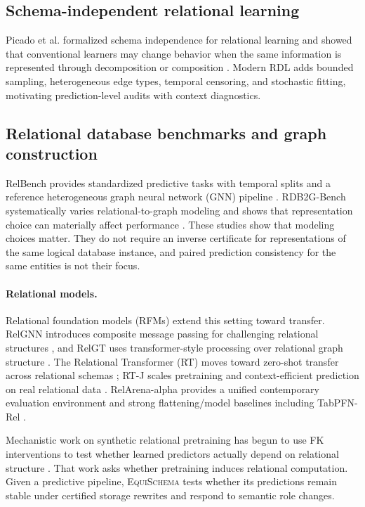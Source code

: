 \documentclass[runningheads]{llncs}
\newcommand{\method}{\textsc{EquiSchema}\xspace}
\begin{document}
\subsection{Schema-independent relational learning}
Picado et al. formalized schema independence for relational learning and showed that conventional learners may change behavior when the same information is represented through decomposition or composition \cite{picado2017schema}. Modern RDL adds bounded sampling, heterogeneous edge types, temporal censoring, and stochastic fitting, motivating prediction-level audits with context diagnostics.

\subsection{Relational database benchmarks and graph construction}
RelBench provides standardized predictive tasks with temporal splits and a reference heterogeneous graph neural network (GNN) pipeline \cite{robinson2024relbench}. RDB2G-Bench systematically varies relational-to-graph modeling and shows that representation choice can materially affect performance \cite{choi2025rdb2g}. These studies show that modeling choices matter. They do not require an inverse certificate for representations of the same logical database instance, and paired prediction consistency for the same entities is not their focus.

\paragraph{Relational models.}
Relational foundation models (RFMs) extend this setting toward transfer. RelGNN introduces composite message passing for challenging relational structures \cite{chen2025relgnn}, and RelGT uses transformer-style processing over relational graph structure \cite{dwivedi2026relgt}. The Relational Transformer (RT) moves toward zero-shot transfer across relational schemas \cite{ranjan2026rt}; RT-J scales pretraining and context-efficient prediction on real relational data \cite{ranjan2026rtj}. RelArena-alpha provides a unified contemporary evaluation environment and strong flattening/model baselines including TabPFN-Rel \cite{hayler2026relarena}.

Mechanistic work on synthetic relational pretraining has begun to use FK interventions to test whether learned predictors actually depend on relational structure \cite{dubey2026synthetic}. That work asks whether pretraining induces relational computation. Given a predictive pipeline, \method tests whether its predictions remain stable under certified storage rewrites and respond to semantic role changes.
\end{document}
